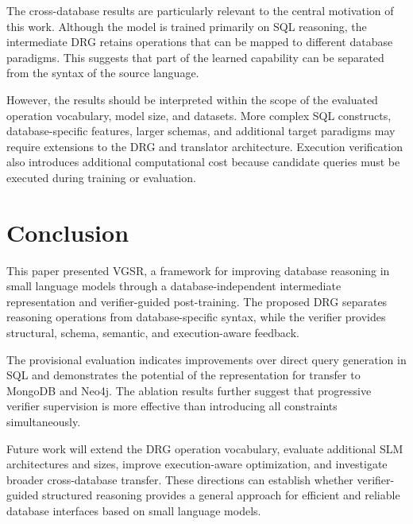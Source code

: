 \documentclass[conference]{IEEEtran}
\begin{document}
The cross-database results are particularly relevant to the central motivation of this work. Although the model is trained primarily on SQL reasoning, the intermediate DRG retains operations that can be mapped to different database paradigms. This suggests that part of the learned capability can be separated from the syntax of the source language.

However, the results should be interpreted within the scope of the evaluated operation vocabulary, model size, and datasets. More complex SQL constructs, database-specific features, larger schemas, and additional target paradigms may require extensions to the DRG and translator architecture. Execution verification also introduces additional computational cost because candidate queries must be executed during training or evaluation.

\section{Conclusion}
\label{sec:conclusion}

This paper presented VGSR, a framework for improving database reasoning in small language models through a database-independent intermediate representation and verifier-guided post-training. The proposed DRG separates reasoning operations from database-specific syntax, while the verifier provides structural, schema, semantic, and execution-aware feedback.

The provisional evaluation indicates improvements over direct query generation in SQL and demonstrates the potential of the representation for transfer to MongoDB and Neo4j. The ablation results further suggest that progressive verifier supervision is more effective than introducing all constraints simultaneously.

Future work will extend the DRG operation vocabulary, evaluate additional SLM architectures and sizes, improve execution-aware optimization, and investigate broader cross-database transfer. These directions can establish whether verifier-guided structured reasoning provides a general approach for efficient and reliable database interfaces based on small language models.
\end{document}
